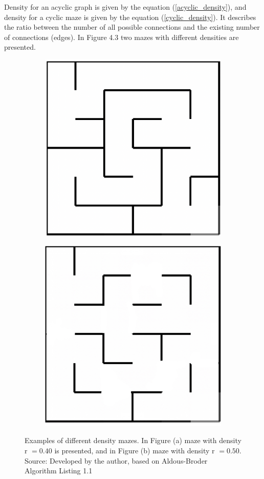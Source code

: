 \newline
\newline
Density for an acyclic graph is given by the equation (\ref{acyclic_density}), and density for a cyclic maze is given by the equation (\ref{cyclic_density}).
It describes the ratio between the number of all possible connections and the existing number of connections (edges).
\newpage
In Figure 4.3 two mazes with different
densities are presented.
\begin{figure}[!h]
\centering
\begin{subfigure}{.5\textwidth}
\centering
\includegraphics[width=.5\linewidth]{recursivedens}
\caption{}
\label{fig:sub1}
\end{subfigure}%
\begin{subfigure}{.5\textwidth}
\centering
\includegraphics[width=.5\linewidth]{recursivedensecyclic}
\caption{}
\label{fig:sub2}
\end{subfigure}
\caption{Examples of different density mazes. In Figure (a) maze with density r $= 0.40$ is presented, and in Figure (b) maze with density r $ = 0.50$.\\Source: Developed by the author,  based on Aldous-Broder Algorithm Listing 1.1}
\label{fig:test}
\end{figure}

